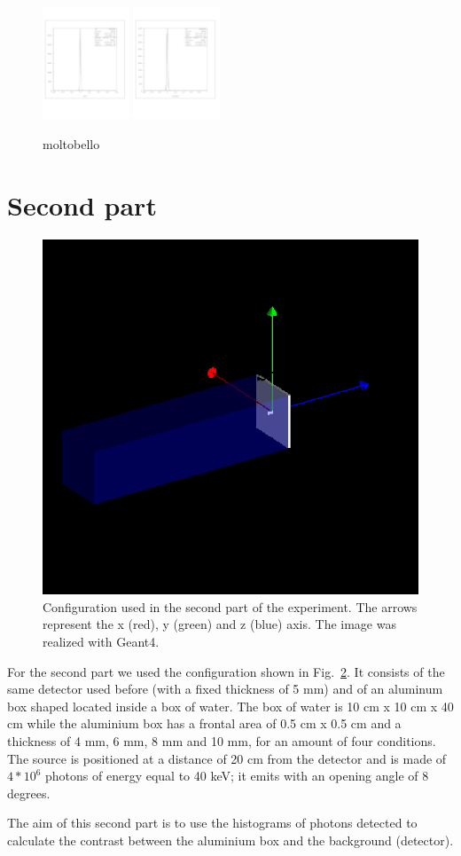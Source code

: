 \documentclass[a4paper]{article}
\begin{document}
\begin{figure}[!htb]
  \includegraphics[width=0.23\textwidth]{ex_images/1_005_140_xs.jpg}
  \includegraphics[width=0.23\textwidth]{ex_images/1_005_140_xse.jpg}

  \caption{moltobello}
  \label{fig:one_one}
\end{figure}

\section{Second part}
\begin{figure}[!htb]
  \centering
  \includegraphics[width=0.6\columnwidth]{detector2.png}
  \caption{Configuration used in the second part of the experiment. The arrows represent the x (red), y (green) and z (blue) axis. The image was realized with Geant4.}
  \label{fig:conf2}
\end{figure}
For the second part we used the configuration shown in Fig.~\ref{fig:conf2}. It consists of the same detector used before (with a fixed thickness of 5 mm) and of an aluminum box shaped located inside a box of water. The box of water is 10 cm x 10 cm x 40 cm while the aluminium box has a frontal area of 0.5 cm x 0.5 cm and a thickness of 4 mm, 6 mm, 8 mm and 10 mm, for an amount of four conditions. The source is positioned at a distance of 20 cm from the detector and is made of $4*10^{6}$ photons of energy equal to 40 keV; it emits with an opening angle of 8 degrees.

The aim of this second part is to use the histograms of photons detected to calculate the contrast between the aluminium box and the background (detector).
\end{document}
